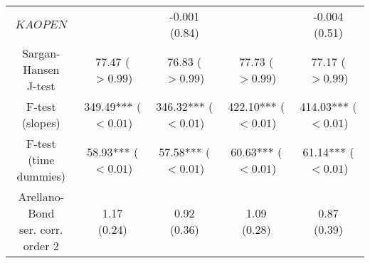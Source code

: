 \begin{tabular}{ccccc}
                                      $KAOPEN$ &                                   &         \makecell{-0.001\\(0.84)} &                                   &         \makecell{-0.004\\(0.51)} \\
              \makecell{Sargan-Hansen\\J-test} &      \makecell{77.47\\($> 0.99$)} &      \makecell{76.83\\($> 0.99$)} &      \makecell{77.73\\($> 0.99$)} &      \makecell{77.17\\($> 0.99$)} \\
                   \makecell{F-test\\(slopes)} &  \makecell{349.49***\\($< 0.01$)} &  \makecell{346.32***\\($< 0.01$)} &  \makecell{422.10***\\($< 0.01$)} &  \makecell{414.03***\\($< 0.01$)} \\
             \makecell{F-test\\(time dummies)} &   \makecell{58.93***\\($< 0.01$)} &   \makecell{57.58***\\($< 0.01$)} &   \makecell{60.63***\\($< 0.01$)} &   \makecell{61.14***\\($< 0.01$)} \\
 \makecell{Arellano-Bond\\ser. corr.  order 2} &           \makecell{1.17\\(0.24)} &           \makecell{0.92\\(0.36)} &           \makecell{1.09\\(0.28)} &           \makecell{0.87\\(0.39)} \\
\bottomrule
\end{tabular}
